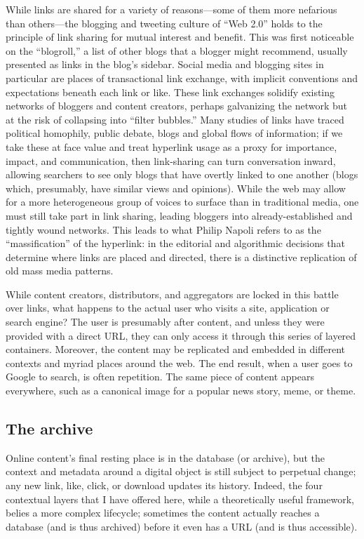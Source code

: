While links are shared for a variety of reasons---some of them more nefarious than others---the blogging and tweeting culture of ``Web 2.0'' holds to the principle of link sharing for mutual interest and benefit. This was first noticeable on the ``blogroll,'' a list of other blogs that a blogger might recommend, usually presented as links in the blog's sidebar. Social media and blogging sites in particular are places of transactional link exchange, with implicit conventions and expectations beneath each link or like. These link exchanges solidify existing networks of bloggers and content creators, perhaps galvanizing the network but at the risk of collapsing into ``filter bubbles.'' Many studies of links have traced political homophily, public debate, blogs and global flows of information; if we take these at face value and treat hyperlink usage as a proxy for importance, impact, and communication, then link-sharing can turn conversation inward, allowing searchers to see only blogs that have overtly linked to one another (blogs which, presumably, have similar views and opinions).\autocite[See][]{graells-garrido_data_2013} While the web may allow for a more heterogeneous group of voices to surface than in traditional media, one must still take part in link sharing, leading bloggers into already-established and tightly wound networks. This leads to what Philip Napoli refers to as the ``massification'' of the hyperlink: in the editorial and algorithmic decisions that determine where links are placed and directed, there is a distinctive replication of old mass media patterns.\autocite{tsui_hyperlinking_2008}

While content creators, distributors, and aggregators are locked in this battle over links, what happens to the actual user who visits a site, application or search engine? The user is presumably after content, and unless they were provided with a direct URL, they can only access it through this series of layered containers. Moreover, the content may be replicated and embedded in different contexts and myriad places around the web. The end result, when a user goes to Google to search, is often repetition. The same piece of content appears everywhere, such as a canonical image for a popular news story, meme, or theme.

\subsection{The archive}

Online content's final resting place is in the database (or archive), but the context and metadata around a digital object is still subject to perpetual change; any new link, like, click, or download updates its history. Indeed, the four contextual layers that I have offered here, while a theoretically useful framework, belies a more complex lifecycle; sometimes the content actually reaches a database (and is thus archived) before it even has a URL (and is thus accessible).

